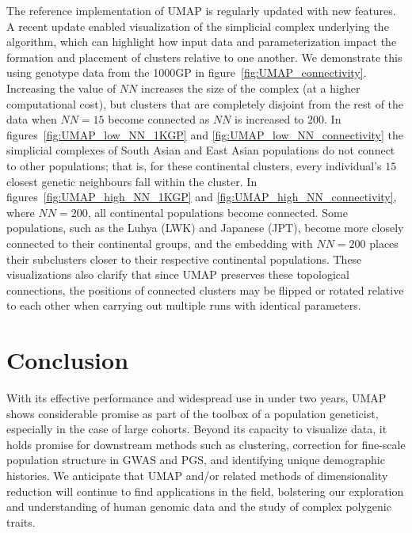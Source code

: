 \documentclass[12pt]{article}
\begin{document}
The reference implementation of UMAP is regularly updated with new features\cite{mcinnes2018software}. A recent update enabled visualization of the simplicial complex underlying the algorithm, which can highlight how input data and parameterization impact the formation and placement of clusters relative to one another. We demonstrate this using genotype data from the 1000GP in figure~\ref{fig:UMAP_connectivity}. Increasing the value of $NN$ increases the size of the complex (at a higher computational cost), but clusters that are completely disjoint from the rest of the data when $NN=15$ become connected as $NN$ is increased to $200$. In figures~\ref{fig:UMAP_low_NN_1KGP} and \ref{fig:UMAP_low_NN_connectivity} the simplicial complexes of South Asian and East Asian populations do not connect to other populations; that is, for these continental clusters, every individual's $15$ closest genetic neighbours fall within the cluster. In figures~\ref{fig:UMAP_high_NN_1KGP} and \ref{fig:UMAP_high_NN_connectivity}, where $NN=200$, all continental populations become connected. Some populations, such as the Luhya (LWK) and Japanese (JPT), become more closely connected to their continental groups, and the embedding with $NN=200$ places their subclusters closer to their respective continental populations. These visualizations also clarify that since UMAP preserves these topological connections, the positions of connected clusters may be flipped or rotated relative to each other when carrying out multiple runs with identical parameters.

\section*{Conclusion}
With its effective performance and widespread use in under two years, UMAP shows considerable promise as part of the toolbox of a population geneticist, especially in the case of large cohorts. Beyond its capacity to visualize data, it holds promise for downstream methods such as clustering, correction for fine-scale population structure in GWAS and PGS, and identifying unique demographic histories. We anticipate that UMAP and/or related methods of dimensionality reduction will continue to find applications in the field, bolstering our exploration and understanding of human genomic data and the study of complex polygenic traits.
\end{document}
